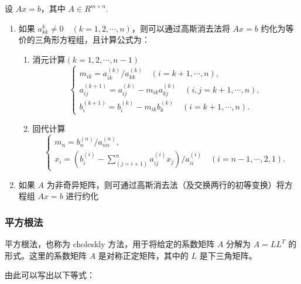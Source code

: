 设 $Ax = b$，其中 $A \in R^{m \times n}$.

\begin{enumerate}
    \item 如果 $a_{kk}^{k} \neq 0\quad(k=1, 2 , \cdots, n)$，则可以通过高斯消去法将 $Ax = b$ 约化为等价的三角形方程组，且计算公式为：
          \begin{enumerate}
              \item 消元计算$(k=1, 2, \cdots, n - 1)$
                    \begin{equation*}
                        \left\{\begin{matrix}
                            m_{ik} = a_{ik}^{(k)} / a_{kk}^{(k)} \quad (i = k + 1, \cdots, n),                  \\
                            a_{ij}^{(k+1)} = a_{ij}^{(k)} - m_{ik}a_{kj}^{(k)} \quad (i, j = k + 1, \cdots, n), \\
                            b_i^{(k+1)} = b_i^{(k)} - m_{ik}b_k^{(k)} \quad (i = k + 1, \cdots, n).
                        \end{matrix}\right.
                    \end{equation*}
              \item 回代计算
                    \begin{equation*}
                        \left\{\begin{matrix}
                            m_n = b_n^{(n)} / a_{nn}^{(n)}, \\
                            x_i = (b_i^{(i)} - \sum_{(j = i + 1)}^n a_{ij}^{(i)}x_j) / a_{ii} ^{(i)} \quad (i = n - 1, \cdots, 2, 1).
                        \end{matrix}\right.
                    \end{equation*}
          \end{enumerate}
    \item 如果 $A$ 为非奇异矩阵，则可通过高斯消去法（及交换两行的初等变换）将方程组 $Ax = b$ 进行约化
\end{enumerate}

\subsubsection{平方根法}

平方根法，也称为 choleskly 方法，用于将给定的系数矩阵 \(A\) 分解为
\(A = L L^T\) 的形式。这里的系数矩阵 \(A\) 是对称正定矩阵，其中的 \(L\)
是下三角矩阵。

由此可以写出以下等式：

